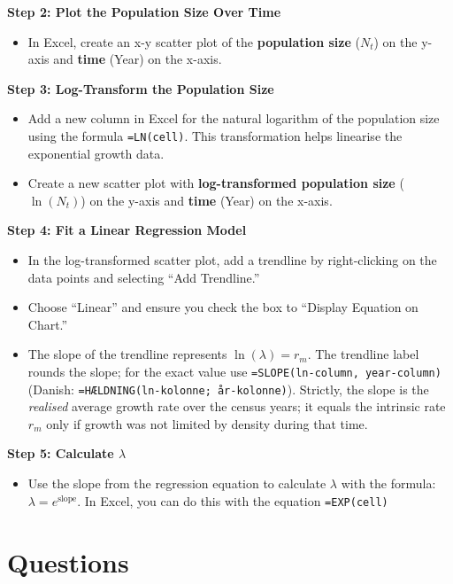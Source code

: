 \documentclass[
  a4paper]{book}
\providecommand{\tightlist}{%
  \setlength{\itemsep}{0pt}\setlength{\parskip}{0pt}}
\begin{document}
\textbf{Step 2: Plot the Population Size Over Time}

\begin{itemize}
\tightlist
\item
  In Excel, create an x-y scatter plot of the \textbf{population size} (\(N_t\)) on the y-axis and \textbf{time} (Year) on the x-axis.
\end{itemize}

\textbf{Step 3: Log-Transform the Population Size}

\begin{itemize}
\tightlist
\item
  Add a new column in Excel for the natural logarithm of the population size using the formula \texttt{=LN(cell)}. This transformation helps linearise the exponential growth data.
\item
  Create a new scatter plot with \textbf{log-transformed population size} (\(\ln(N_t)\)) on the y-axis and \textbf{time} (Year) on the x-axis.
\end{itemize}

\textbf{Step 4: Fit a Linear Regression Model}

\begin{itemize}
\tightlist
\item
  In the log-transformed scatter plot, add a trendline by right-clicking on the data points and selecting ``Add Trendline.''
\item
  Choose ``Linear'' and ensure you check the box to ``Display Equation on Chart.''
\item
  The slope of the trendline represents \(\ln(\lambda) = r_m\). The trendline label rounds the slope; for the exact value use \texttt{=SLOPE(ln-column,\ year-column)} (Danish: \texttt{=HÆLDNING(ln-kolonne;\ år-kolonne)}). Strictly, the slope is the \emph{realised} average growth rate over the census years; it equals the intrinsic rate \(r_m\) only if growth was not limited by density during that time.
\end{itemize}

\textbf{Step 5: Calculate \(\lambda\)}

\begin{itemize}
\tightlist
\item
  Use the slope from the regression equation to calculate \(\lambda\) with the formula: \(\lambda = e^{\text{slope}}\). In Excel, you can do this with the equation \texttt{=EXP(cell)}
\end{itemize}

\section{Questions}\label{questions-3}
\end{document}
